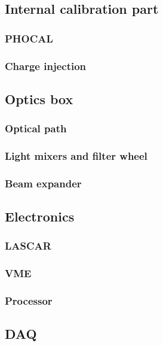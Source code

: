 \documentclass[UKenglish,texlive=2013]{\ATLASLATEXPATH atlasdoc}
\newcommand{\phocal}{{\sc PHOCAL}}
\begin{document}
\subsection{Internal calibration part}

\subsubsection{\phocal}
\subsubsection{Charge injection}

\subsection{Optics box}



\subsubsection{Optical path}
\subsubsection{Light mixers and filter wheel}
\subsubsection{Beam expander}

\subsection{Electronics}

\subsubsection{LASCAR}
\subsubsection{VME}
\subsubsection{Processor}

\subsection{DAQ}
\end{document}
